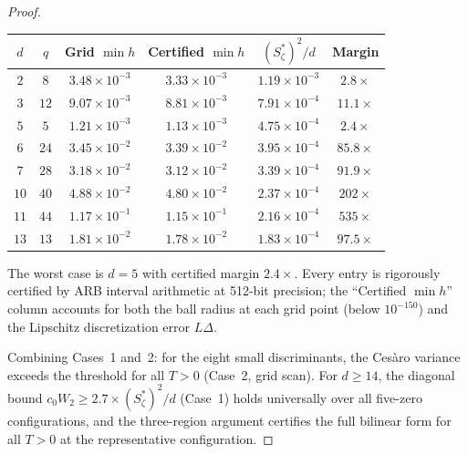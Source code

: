 \documentclass[12pt,reqno]{amsart}
\theoremstyle{plain}
\theoremstyle{definition}
\theoremstyle{remark}
\begin{document}
\begin{proof}
\begin{center}
\renewcommand{\arraystretch}{1.2}
\begin{tabular}{cccccc}
\toprule
$d$ & $q$ & Grid $\min h$ & Certified $\min h$ & $(S_\zeta^*)^2/d$ & Margin \\
\midrule
$2$  & $8$  & $3.48 \times 10^{-3}$ & $3.33 \times 10^{-3}$ & $1.19 \times 10^{-3}$ & $2.8\times$    \\
$3$  & $12$ & $9.07 \times 10^{-3}$ & $8.81 \times 10^{-3}$ & $7.91 \times 10^{-4}$ & $11.1\times$   \\
$5$  & $5$  & $1.21 \times 10^{-3}$ & $1.13 \times 10^{-3}$ & $4.75 \times 10^{-4}$ & $2.4\times$    \\
$6$  & $24$ & $3.45 \times 10^{-2}$ & $3.39 \times 10^{-2}$ & $3.95 \times 10^{-4}$ & $85.8\times$   \\
$7$  & $28$ & $3.18 \times 10^{-2}$ & $3.12 \times 10^{-2}$ & $3.39 \times 10^{-4}$ & $91.9\times$   \\
$10$ & $40$ & $4.88 \times 10^{-2}$ & $4.80 \times 10^{-2}$ & $2.37 \times 10^{-4}$ & $202\times$    \\
$11$ & $44$ & $1.17 \times 10^{-1}$ & $1.15 \times 10^{-1}$ & $2.16 \times 10^{-4}$ & $535\times$    \\
$13$ & $13$ & $1.81 \times 10^{-2}$ & $1.78 \times 10^{-2}$ & $1.83 \times 10^{-4}$ & $97.5\times$   \\
\bottomrule
\end{tabular}
\end{center}
The worst case is $d = 5$ with certified margin $2.4\times$.  Every entry is rigorously certified by ARB interval arithmetic at 512-bit precision; the ``Certified $\min h$'' column accounts for both the ball radius at each grid point (below $10^{-150}$) and the Lipschitz discretization error $L\Delta$.

\medskip
Combining Cases~1 and~2: for the eight small discriminants, the Ces\`aro variance exceeds the threshold for all $T > 0$ (Case~2, grid scan).  For $d \geq 14$, the diagonal bound $c_0 W_2 \geq 2.7 \times (S_\zeta^*)^2/d$ (Case~1) holds universally over all five-zero configurations, and the three-region argument certifies the full bilinear form for all $T > 0$ at the representative configuration.
\end{proof}
\end{document}

